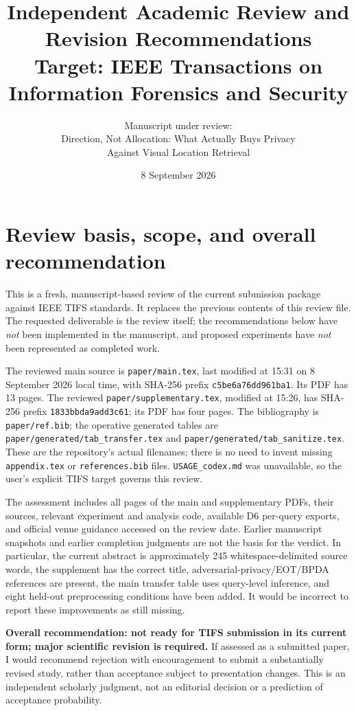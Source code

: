 \documentclass[11pt,a4paper]{article}
\title{Independent Academic Review and Revision Recommendations\\
\large Target: IEEE Transactions on Information Forensics and Security}
\author{Manuscript under review:\\
\normalsize Direction, Not Allocation: What Actually Buys Privacy\\
\normalsize Against Visual Location Retrieval}
\date{8 September 2026}
\newcommand{\file}[1]{\nolinkurl{#1}}
\begin{document}
\maketitle

\section{Review basis, scope, and overall recommendation}

This is a fresh, manuscript-based review of the current submission package against IEEE TIFS standards. It replaces the previous contents of this review file. The requested deliverable is the review itself; the recommendations below have \emph{not} been implemented in the manuscript, and proposed experiments have \emph{not} been represented as completed work.

The reviewed main source is \file{paper/main.tex}, last modified at 15:31 on 8 September 2026 local time, with SHA-256 prefix \file{c5be6a76dd961ba1}. Its PDF has 13 pages. The reviewed \file{paper/supplementary.tex}, modified at 15:26, has SHA-256 prefix \file{1833bbda9add3c61}; its PDF has four pages. The bibliography is \file{paper/ref.bib}; the operative generated tables are \file{paper/generated/tab_transfer.tex} and \file{paper/generated/tab_sanitize.tex}. These are the repository's actual filenames; there is no need to invent missing \file{appendix.tex} or \file{references.bib} files. \file{USAGE_codex.md} was unavailable, so the user's explicit TIFS target governs this review.

The assessment includes all pages of the main and supplementary PDFs, their sources, relevant experiment and analysis code, available D6 per-query exports, and official venue guidance accessed on the review date. Earlier manuscript snapshots and earlier completion judgments are not the basis for the verdict. In particular, the current abstract is approximately 245 whitespace-delimited source words, the supplement has the correct title, adversarial-privacy/EOT/BPDA references are present, the main transfer table uses query-level inference, and eight held-out preprocessing conditions have been added. It would be incorrect to report these improvements as still missing.

\textbf{Overall recommendation: not ready for TIFS submission in its current form; major scientific revision is required.} If assessed as a submitted paper, I would recommend rejection with encouragement to submit a substantially revised study, rather than acceptance subject to presentation changes. This is an independent scholarly judgment, not an editorial decision or a prediction of acceptance probability.
\end{document}
